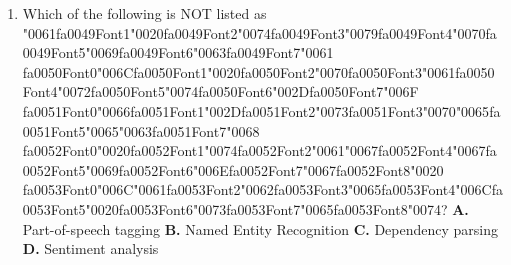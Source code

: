\documentclass[11pt]{article}
\begin{document}
\begin{enumerate}[leftmargin=*]
  \item Which of the following is NOT listed as {\char"0061}{\csname fa0049Font1\endcsname\char"0020}{\csname fa0049Font2\endcsname\char"0074}{\csname fa0049Font3\endcsname\char"0079}{\csname fa0049Font4\endcsname\char"0070}{\csname fa0049Font5\endcsname\char"0069}{\csname fa0049Font6\endcsname\char"0063}{\csname fa0049Font7\endcsname\char"0061} {\csname fa0050Font0\endcsname\char"006C}{\csname fa0050Font1\endcsname\char"0020}{\csname fa0050Font2\endcsname\char"0070}{\csname fa0050Font3\endcsname\char"0061}{\csname fa0050Font4\endcsname\char"0072}{\csname fa0050Font5\endcsname\char"0074}{\csname fa0050Font6\endcsname\char"002D}{\csname fa0050Font7\endcsname\char"006F} {\csname fa0051Font0\endcsname\char"0066}{\csname fa0051Font1\endcsname\char"002D}{\csname fa0051Font2\endcsname\char"0073}{\csname fa0051Font3\endcsname\char"0070}{\char"0065}{\csname fa0051Font5\endcsname\char"0065}{\char"0063}{\csname fa0051Font7\endcsname\char"0068} {\csname fa0052Font0\endcsname\char"0020}{\csname fa0052Font1\endcsname\char"0074}{\csname fa0052Font2\endcsname\char"0061}{\char"0067}{\csname fa0052Font4\endcsname\char"0067}{\csname fa0052Font5\endcsname\char"0069}{\csname fa0052Font6\endcsname\char"006E}{\csname fa0052Font7\endcsname\char"0067}{\csname fa0052Font8\endcsname\char"0020} {\csname fa0053Font0\endcsname\char"006C}{\char"0061}{\csname fa0053Font2\endcsname\char"0062}{\csname fa0053Font3\endcsname\char"0065}{\csname fa0053Font4\endcsname\char"006C}{\csname fa0053Font5\endcsname\char"0020}{\csname fa0053Font6\endcsname\char"0073}{\csname fa0053Font7\endcsname\char"0065}{\csname fa0053Font8\endcsname\char"0074}?
    \textbf{A.} Part-of-speech tagging
    \textbf{B.} Named Entity Recognition
    \textbf{C.} Dependency parsing
    \textbf{D.} Sentiment analysis


\end{enumerate}
\end{document}
